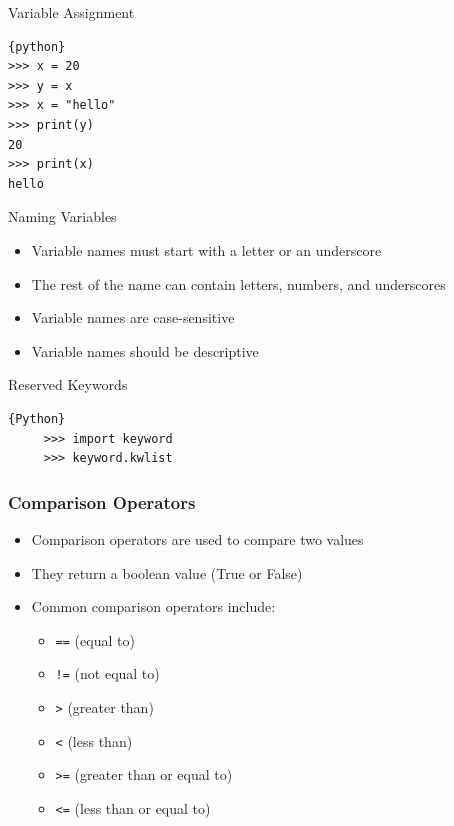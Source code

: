 \documentclass{beamer}
\begin{document}
\begin{frame}[fragile]{Variable Assignment}
    \begin{lstlisting}{python}
>>> x = 20
>>> y = x
>>> x = "hello"
>>> print(y)
20
>>> print(x)
hello
    \end{lstlisting}
\end{frame}


\begin{frame}{Naming Variables}
    \begin{itemize}
        \item Variable names must start with a letter or an underscore
        \item The rest of the name can contain letters, numbers, and underscores
        \item Variable names are case-sensitive
        \item Variable names should be descriptive
    \end{itemize}
\end{frame}

\begin{frame}[fragile]{Reserved Keywords}
    \begin{lstlisting}{Python}
     >>> import keyword
     >>> keyword.kwlist      
    \end{lstlisting}
\end{frame} 

\begin{frame}
    \frametitle{Comparison Operators}
    \begin{itemize}
        \item Comparison operators are used to compare two values
        \item They return a boolean value (True or False)
        \item Common comparison operators include:
        \begin{itemize}
            \item \texttt{==} (equal to)
            \item \texttt{!=} (not equal to)
            \item \texttt{>} (greater than)
            \item \texttt{<} (less than)
            \item \texttt{>=} (greater than or equal to)
            \item \texttt{<=} (less than or equal to)
        \end{itemize}
    \end{itemize}
\end{frame}
\end{document}
